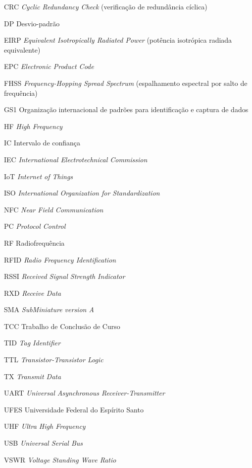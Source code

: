 %
%

\begin{siglas}
    \setlength{\itemsep}{0pt}
    \setlength{\parskip}{0pt}
    \item[CRC] \textit{Cyclic Redundancy Check} (verificação de redundância cíclica)
    \item[DP] Desvio-padrão
    \item[EIRP] \textit{Equivalent Isotropically Radiated Power} (potência isotrópica radiada equivalente)
    \item[EPC] \textit{Electronic Product Code}
    \item[FHSS] \textit{Frequency-Hopping Spread Spectrum} (espalhamento espectral por salto de frequência)
    \item[GS1] Organização internacional de padrões para identificação e captura de dados
    \item[HF] \textit{High Frequency}
    \item[IC] Intervalo de confiança
    \item[IEC] \textit{International Electrotechnical Commission}
    \item[IoT] \textit{Internet of Things}
    \item[ISO] \textit{International Organization for Standardization}
    \item[NFC] \textit{Near Field Communication}
    \item[PC] \textit{Protocol Control}
    \item[RF] Radiofrequência
    \item[RFID] \textit{Radio Frequency Identification}
    \item[RSSI] \textit{Received Signal Strength Indicator}
    \item[RXD] \textit{Receive Data}
    \item[SMA] \textit{SubMiniature version A}
    \item[TCC] Trabalho de Conclusão de Curso
    \item[TID] \textit{Tag Identifier}
    \item[TTL] \textit{Transistor-Transistor Logic}
    \item[TX] \textit{Transmit Data}
    \item[UART] \textit{Universal Asynchronous Receiver-Transmitter}
    \item[UFES] Universidade Federal do Espírito Santo
    \item[UHF] \textit{Ultra High Frequency}
    \item[USB] \textit{Universal Serial Bus}
    \item[VSWR] \textit{Voltage Standing Wave Ratio}
\end{siglas}
